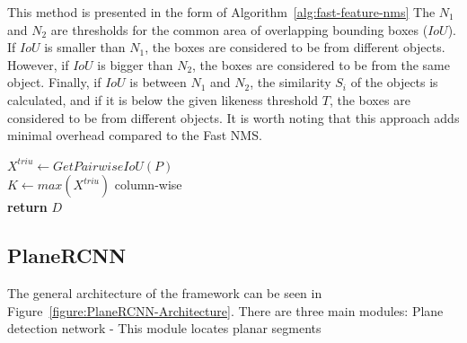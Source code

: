 \par

This method is presented in the form of Algorithm~\ref{alg:fast-feature-nms}
The $N_1$ and $N_2$ are thresholds for the common area of overlapping bounding boxes ($IoU$).
If $IoU$ is smaller than $N_1$, the boxes are considered to be from different objects.
However, if $IoU$ is bigger than $N_2$, the boxes are considered to be from the same object.
Finally, if $IoU$ is between $N_1$ and $N_2$, the similarity $S_i$ of the objects is calculated,
and if it is below the given likeness threshold $T$, the boxes are considered to be from different objects.
It is worth noting that this approach adds minimal overhead compared to the Fast NMS.

\begin{minipage}{\linewidth}
\begin{algorithm}[H] \label{alg:fast-feature-nms}
    \SetAlgoLined
    $X^{triu} \leftarrow GetPairwiseIoU(P)$ \\
    $K \leftarrow max(X^{triu})$ column-wise \\
    \textbf{return} $D$
    \caption{Fast Feature NMS \cite{inproceedingsPlaneSegNet}}
\end{algorithm}
\end{minipage}

\subsection{PlaneRCNN}

The general architecture of the framework can be seen in Figure~\ref{figure:PlaneRCNN-Architecture}.
There are three main modules:
Plane detection network - This module locates planar segments
